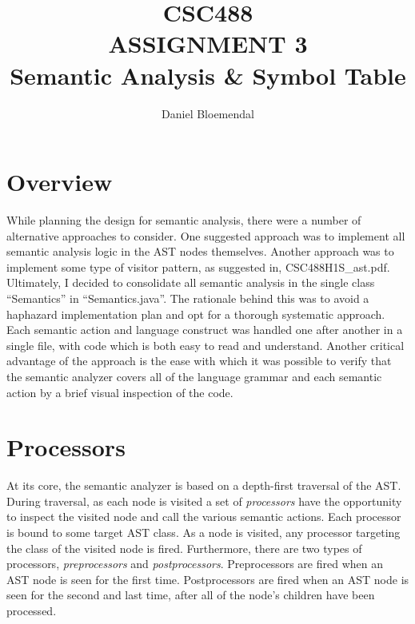 \documentclass[oneside]{amsart}
\theoremstyle{definition}
\theoremstyle{remark}
\numberwithin{equation}{section}
\begin{document}
\title[CSC488 A3]{CSC488\\ASSIGNMENT 3\\Semantic Analysis \& Symbol Table}
\author{Daniel Bloemendal}

\begin{titlepage}
\maketitle
\thispagestyle{empty}
\tableofcontents
\end{titlepage}

\section{Overview}
While planning the design for semantic analysis, there were a number of alternative approaches to
consider. One suggested approach was to implement all semantic analysis logic in the AST nodes
themselves. Another approach was to implement some type of visitor pattern, as suggested in,
CSC488H1S\_ast.pdf. Ultimately, I decided to consolidate all semantic analysis in the single class
``Semantics'' in ``Semantics.java''. The rationale behind this was to avoid a haphazard
implementation plan and opt for a thorough systematic approach. Each semantic action and language
construct was handled one after another in a single file, with code which is both easy to read and
understand. Another critical advantage of the approach is the ease with which it was possible to
verify that the semantic analyzer covers all of the language grammar and each semantic action by a
brief visual inspection of the code.

\section{Processors}
At its core, the semantic analyzer is based on a depth-first traversal of the AST. During traversal,
as each node is visited a set of \emph{processors} have the opportunity to inspect the visited node
and call the various semantic actions. Each processor is bound to some target AST class. As a node
is visited, any processor targeting the class of the visited node is fired. Furthermore, there are
two types of processors, \emph{preprocessors} and \emph{postprocessors}. Preprocessors are fired
when an AST node is seen for the first time. Postprocessors are fired when an AST node is seen for
the second and last time, after all of the node's children have been processed.
\end{document}
